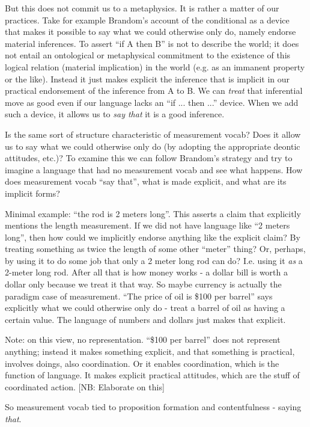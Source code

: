 \documentclass[11pt,twoside]{article}
\begin{document}
But this does not commit us to a metaphysics.  It is rather a matter
of our practices.  Take for example Brandom's account of the
conditional as a device that makes it possible to say what we could
otherwise only do, namely endorse material inferences.  To assert ``if
A then B'' is not to describe the world; it does not entail an
ontological or metaphysical commitment to the existence of this
logical relation (material implication) in the world (e.g. as an
immanent property or the like).  Instead it just makes explicit the
inference that is implicit in our practical endorsement of the
inference from A to B.  We can \textit{treat} that inferential move as
good even if our language lacks an ``if ... then ...'' device.  When
we add such a device, it allows us to \textit{say that} it is a good
inference.

Is the same sort of structure characteristic of measurement vocab?
Does it allow us to say what we could otherwise only do (by adopting
the appropriate deontic attitudes, etc.)?  To examine this we can
follow Brandom's strategy and try to imagine a language that had no
measurement vocab and see what happens.  How does measurement vocab
``say that'', what is made explicit, and what are its implicit forms?

Minimal example: ``the rod is 2 meters long''.  This asserts a claim
that explicitly mentions the length measurement.  If we did not have
language like ``2 meters long'', then how could we implicitly endorse
anything like the explicit claim?  By treating something as twice the
length of some other ``meter'' thing?  Or, perhaps, by using it to do
some job that only a 2 meter long rod can do?  I.e. using it
\textit{as} a 2-meter long rod.  After all that is how money works - a
dollar bill is worth a dollar only because we treat it that way.  So
maybe currency is actually the paradigm case of measurement.  ``The
price of oil is \$100 per barrel'' says explicitly what we could
otherwise only do - treat a barrel of oil as having a certain value.
The language of numbers and dollars just makes that explicit.

Note: on this view, no representation.  ``\$100 per barrel'' does not
represent anything; instead it makes something explicit, and that
something is practical, involves doings, also coordination.  Or it
enables coordination, which is the function of language.  It makes
explicit practical attitudes, which are the stuff of coordinated
action.  [NB: Elaborate on this]

So measurement vocab tied to proposition formation and contentfulness
- saying \textit{that}.
\end{document}
